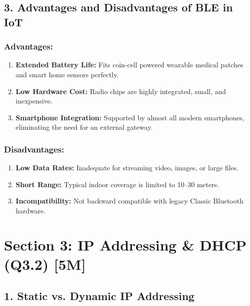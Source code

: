 \subsection{3. Advantages and Disadvantages of BLE in IoT}

\subsubsection{Advantages:}
\begin{enumerate}
  \item \textbf{Extended Battery Life:} Fits coin-cell powered wearable medical patches and smart home sensors perfectly.
  \item \textbf{Low Hardware Cost:} Radio chips are highly integrated, small, and inexpensive.
  \item \textbf{Smartphone Integration:} Supported by almost all modern smartphones, eliminating the need for an external gateway.
\end{enumerate}

\subsubsection{Disadvantages:}
\begin{enumerate}
  \item \textbf{Low Data Rates:} Inadequate for streaming video, images, or large files.
  \item \textbf{Short Range:} Typical indoor coverage is limited to 10–30 meters.
  \item \textbf{Incompatibility:} Not backward compatible with legacy Classic Bluetooth hardware.
\end{enumerate}


\section{Section 3: IP Addressing \& DHCP (Q3.2) [5M]}

\subsection{1. Static vs. Dynamic IP Addressing}

